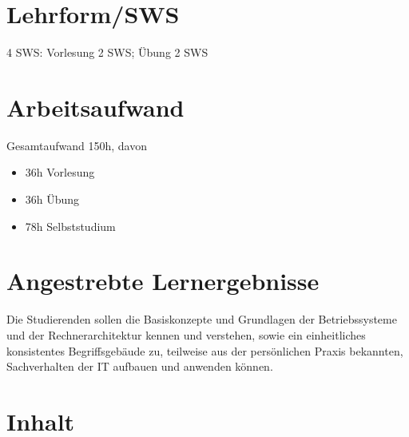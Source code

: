 \hypertarget{lehrformswspathlabelmi-2017modulbeschreibungen-bachelorba_einfhrunginbetriebssystemeundrechnerarchitektur}{%
\section*{Lehrform/SWS\label{/mi-2017/modulbeschreibungen-bachelor/BA_EinfhrunginBetriebssystemeundRechnerarchitektur}}\label{lehrformswspathlabelmi-2017modulbeschreibungen-bachelorba_einfhrunginbetriebssystemeundrechnerarchitektur}}

4 SWS: Vorlesung 2 SWS; Übung 2 SWS

\hypertarget{arbeitsaufwandpathlabelmi-2017modulbeschreibungen-bachelorba_einfhrunginbetriebssystemeundrechnerarchitektur}{%
\section*{Arbeitsaufwand\label{/mi-2017/modulbeschreibungen-bachelor/BA_EinfhrunginBetriebssystemeundRechnerarchitektur}}\label{arbeitsaufwandpathlabelmi-2017modulbeschreibungen-bachelorba_einfhrunginbetriebssystemeundrechnerarchitektur}}

Gesamtaufwand 150h, davon

\begin{itemize}
\tightlist
\item
  36h Vorlesung
\item
  36h Übung
\item
  78h Selbststudium
\end{itemize}

\hypertarget{angestrebte-lernergebnissepathlabelmi-2017modulbeschreibungen-bachelorba_einfhrunginbetriebssystemeundrechnerarchitektur}{%
\section*{Angestrebte
Lernergebnisse\label{/mi-2017/modulbeschreibungen-bachelor/BA_EinfhrunginBetriebssystemeundRechnerarchitektur}}\label{angestrebte-lernergebnissepathlabelmi-2017modulbeschreibungen-bachelorba_einfhrunginbetriebssystemeundrechnerarchitektur}}

Die Studierenden sollen die Basiskonzepte und Grundlagen der
Betriebssysteme und der Rechnerarchitektur kennen und verstehen, sowie
ein einheitliches konsistentes Begriffsgebäude zu, teilweise aus der
persönlichen Praxis bekannten, Sachverhalten der IT aufbauen und
anwenden können.

\hypertarget{inhaltpathlabelmi-2017modulbeschreibungen-bachelorba_einfhrunginbetriebssystemeundrechnerarchitektur}{%
\section*{Inhalt\label{/mi-2017/modulbeschreibungen-bachelor/BA_EinfhrunginBetriebssystemeundRechnerarchitektur}}\label{inhaltpathlabelmi-2017modulbeschreibungen-bachelorba_einfhrunginbetriebssystemeundrechnerarchitektur}}

